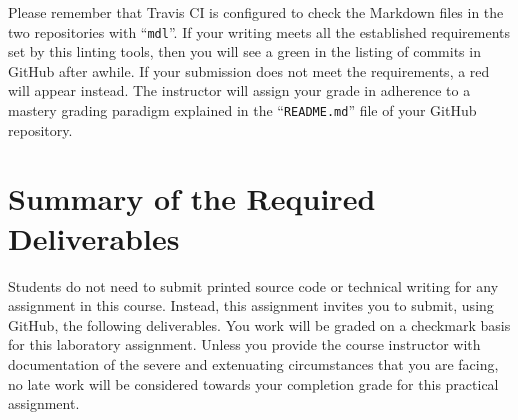 \documentclass[11pt]{article}
\newcommand{\command}[1]{``\lstinline{#1}''}
\newcommand{\checkmark}{\ding{51}}
\newcommand{\naughtmark}{\ding{55}}
\begin{document}


Please remember that Travis CI is configured to check the Markdown files in the
two repositories with \command{mdl}.
%
If your writing meets all the established requirements set by this linting
tools, then you will see a green \checkmark{} in the listing of commits in
GitHub after awhile. If your submission does not meet the requirements, a red
\naughtmark{} will appear instead. The instructor will assign your grade in
adherence to a mastery grading paradigm explained in the \command{README.md}
file of your GitHub repository.



\section*{Summary of the Required Deliverables}

\noindent Students do not need to submit printed source code or technical
writing for any assignment in this course. Instead, this assignment invites you
to submit, using GitHub, the following deliverables. You work will be graded on
a checkmark basis for this laboratory assignment.
%
Unless you provide the course instructor with documentation of the severe and
extenuating circumstances that you are facing, no late work will be considered
towards your completion grade for this practical assignment.
\end{document}
